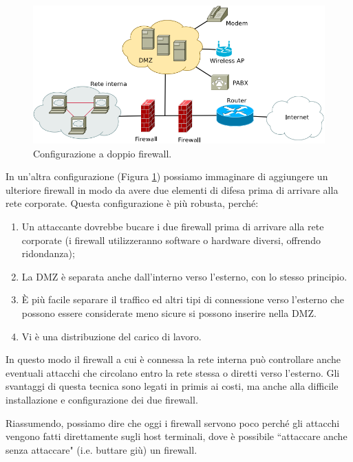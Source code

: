 \begin{figure}[htbp]
	\centering
	\includegraphics[scale = 0.5]{images/double-firewall}
	\caption{Configurazione a doppio firewall.}
	\label{img:double-firewall}
\end{figure}
In un'altra configurazione (Figura \ref{img:double-firewall}) possiamo immaginare di aggiungere un ulteriore firewall in modo da avere due elementi di difesa prima di arrivare alla rete corporate. Questa configurazione è più robusta, perché:
\begin{enumerate}
	\item Un attaccante dovrebbe bucare i due firewall prima di arrivare alla rete corporate (i firewall utilizzeranno software o hardware diversi, offrendo ridondanza);
	\item La DMZ è separata anche dall'interno verso l’esterno, con lo stesso principio.
	\item È più facile separare il traffico ed altri tipi di connessione verso l'esterno che possono essere considerate meno sicure si possono inserire nella DMZ.
	\item Vi è una distribuzione del carico di lavoro.
\end{enumerate}
In questo modo il firewall a cui è connessa la rete interna può controllare anche eventuali attacchi che circolano entro la rete stessa o diretti verso l'esterno. Gli svantaggi di questa tecnica sono legati in primis ai costi, ma anche alla difficile installazione e configurazione dei due firewall.

Riassumendo, possiamo dire che oggi i firewall servono poco perché gli attacchi vengono fatti direttamente sugli host terminali, dove è possibile \textquotedblleft attaccare anche senza attaccare" (i.e. buttare giù) un firewall.

